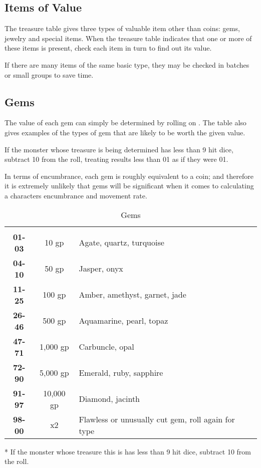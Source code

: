 \begin{multicols*}{2}

\section{Items of Value}
The treasure table gives three types of valuable item other than coins: gems, jewelry and special items. When the treasure table indicates that one or more of these items is present, check each item in turn to find out its value.

If there are many items of the same basic type, they may be checked in batches or small groups to save time.

\subsection{Gems}
The value of each gem can simply be determined by rolling on . The table also gives examples of the types of gem that are likely to be worth the given value.

If the monster whose treasure is being determined has less than 9 hit dice, subtract 10 from the roll, treating results less than 01 as if they were 01.

In terms of encumbrance, each gem is roughly equivalent to a coin; and therefore it is extremely unlikely that gems will be significant when it comes to calculating a characters encumbrance and movement rate.

\begin {table}[H]
  \caption{Gems}\label{tab:Gems}
  \begin{tabularx}{\columnwidth}{>{\bfseries}ccY}
	 &  & \\
	01-03 & 10 gp & Agate, quartz, turquoise\\
	04-10 & 50 gp & Jasper, onyx\\
	11-25 & 100 gp & Amber, amethyst, garnet, jade\\
	26-46 & 500 gp & Aquamarine, pearl, topaz\\
	47-71 & 1,000 gp & Carbuncle, opal\\
	72-90 & 5,000 gp & Emerald, ruby, sapphire\\
	91-97 & 10,000 gp & Diamond, jacinth\\
	98-00 & x2 & Flawless or unusually cut gem, roll again for type\
  \end {tabularx}
	* If the monster whose treasure this is has less than 9 hit dice, subtract 10 from the roll.
\end {table}


\end{multicols*}
